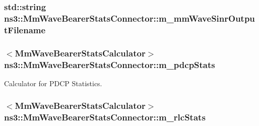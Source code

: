 \subsubsection[{\texorpdfstring{m\+\_\+mm\+Wave\+Sinr\+Output\+Filename}{m_mmWaveSinrOutputFilename}}]{\setlength{\rightskip}{0pt plus 5cm}std\+::string ns3\+::\+Mm\+Wave\+Bearer\+Stats\+Connector\+::m\+\_\+mm\+Wave\+Sinr\+Output\+Filename\hspace{0.3cm}{\ttfamily [private]}}\hypertarget{classns3_1_1MmWaveBearerStatsConnector_a5adea887f7d9677e281482591f490ed8}{}\label{classns3_1_1MmWaveBearerStatsConnector_a5adea887f7d9677e281482591f490ed8}
\subsubsection[{\texorpdfstring{m\+\_\+pdcp\+Stats}{m_pdcpStats}}]{$<${\bf Mm\+Wave\+Bearer\+Stats\+Calculator}$>$ ns3\+::\+Mm\+Wave\+Bearer\+Stats\+Connector\+::m\+\_\+pdcp\+Stats\hspace{0.3cm}{\ttfamily [private]}}\hypertarget{classns3_1_1MmWaveBearerStatsConnector_a6523c73cc057ed84faa3ddfc944ff67f}{}\label{classns3_1_1MmWaveBearerStatsConnector_a6523c73cc057ed84faa3ddfc944ff67f}


Calculator for P\+D\+CP Statistics. 

\subsubsection[{\texorpdfstring{m\+\_\+rlc\+Stats}{m_rlcStats}}]{$<${\bf Mm\+Wave\+Bearer\+Stats\+Calculator}$>$ ns3\+::\+Mm\+Wave\+Bearer\+Stats\+Connector\+::m\+\_\+rlc\+Stats\hspace{0.3cm}{\ttfamily [private]}}\hypertarget{classns3_1_1MmWaveBearerStatsConnector_a3613ebbbe92cd828e66b03c91c7ebcbb}{}\label{classns3_1_1MmWaveBearerStatsConnector_a3613ebbbe92cd828e66b03c91c7ebcbb}


